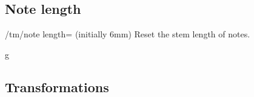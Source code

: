 \subsection{Note length}\label{sec:custom:note-length}
\begin{key}{/tm/note length= (initially 6mm)}
  Reset the stem length of notes.
\end{key}
\begin{codeexample}[]
\begin{tmline}
\begin{tmstaff}{g}{}
  \begin{tmbeam}[note length=1.7cm]
  \end{tmbeam}
\end{tmstaff}
\end{tmline}
\end{codeexample}
\subsection{Transformations}\label{sec:custom:transformations}
